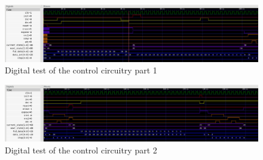 \begin{figure}[H]
  \centering
  \includegraphics[width=\textwidth]{figures/cameraTest1}
  \caption{Digital test of the control circuitry part 1}
  \label{fig:digcamtest1}
\end{figure}

\begin{figure}[H]
  \centering
  \includegraphics[width=\textwidth]{figures/cameraTest2}
  \caption{Digital test of the control circuitry part 2}
  \label{fig:digcamtest2}
\end{figure}